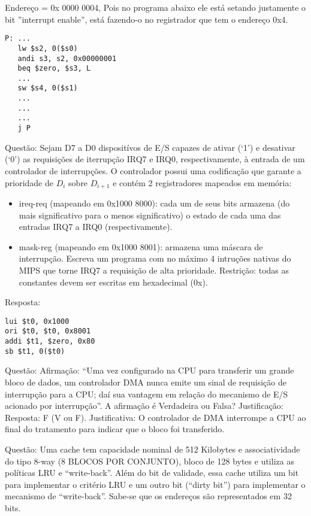 \documentclass{article}
\begin{document}
Endereço = 0x 0000 0004, Pois no programa abaixo ele está setando justamente o
bit ''interrupt enable'', está fazendo-o no registrador que tem o endereço 0x4.


\begin{verbatim}
P: ...
   lw $s2, 0($s0)
   andi s3, s2, 0x00000001
   beq $zero, $s3, L
   ...
   sw $s4, 0($s1)
   ...
   ...
   ...
   j P
\end{verbatim}


Questão: Sejam D7 a D0 dispositívos de E/S capazes de ativar (‘1’) e desativar
(‘0’) as requisições de iterrupção IRQ7 e IRQ0, respectivamente, à entrada de um
controlador de interrupções. O controlador possui uma codificação que garante a
prioridade de $D_{i}$ sobre $D_{i+1}$ e contém 2 registradores mapeados em
memória:

\begin{itemize}
\item ireq-req (mapeando em 0x1000 8000): cada um de seus bits armazena (do mais
significativo para o menos significativo) o estado de cada uma das entradas IRQ7
a IRQ0 (respectivamente).

\item mask-reg (mapeando em 0x1000 8001): armazena uma
máscara de interrupção. Escreva um programa com no máximo 4 intruções nativas do
MIPS que torne IRQ7 a requisição de alta prioridade. Restrição: todas as
constantes devem ser escritas em hexadecimal (0x).
\end{itemize}


Resposta:
\begin{verbatim}
lui $t0, 0x1000
ori $t0, $t0, 0x8001
addi $t1, $zero, 0x80
sb $t1, 0($t0)
\end{verbatim}

Questão: Afirmação: “Uma vez configurado na CPU para transferir um grande bloco
de dados, um controlador DMA nunca emite um sinal de requisição de interrupção
para a CPU; daí sua vantagem em relação do mecanismo de E/S acionado por
interrupção”. A afirmação é Verdadeira ou Falsa? Justificação: Resposta: F (V ou
F). Justificativa: O controlador de DMA interrompe a CPU ao final do tratamento
para indicar que o bloco foi transferido.

Questão: Uma cache tem capacidade nominal de 512 Kilobytes e associatividade do
tipo 8-way (8 BLOCOS POR CONJUNTO), bloco de 128 bytes e utiliza as políticas
LRU e “write-back”. Além do bit de validade, essa cache utiliza um bit para
implementar o critério LRU e um outro bit (“dirty bit”) para implementar o
mecanismo de “write-back”. Sabe-se que os endereços são representados em 32
bits.
\end{document}
